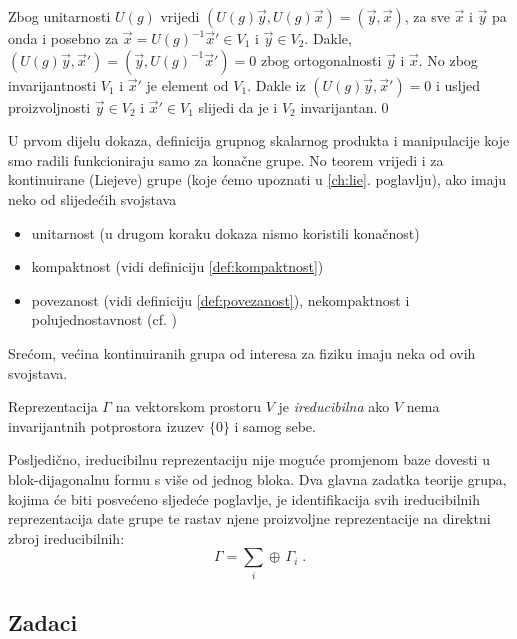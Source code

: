 Zbog unitarnosti $U(g)$ vrijedi $(U(g) \vec{y} , U(g)\vec{x}) = 
(\vec{y}, \vec{x})$,
za sve $\vec{x}$ i $\vec{y}$ pa onda i posebno za 
$\vec{x}=U(g)^{-1}\vec{x}'\in V_1$ i
$\vec{y} \in V_2$. Dakle, $(U(g)\vec{y}, \vec{x}')=(\vec{y}, U(g)^{-1}\vec{x}')
=0$ zbog ortogonalnosti $\vec{y}$ i $\vec{x}$.
No zbog invarijantnosti $V_1$ i $\vec{x}'$ je element od $V_1$. Dakle iz
$(U(g) \vec{y} , \vec{x}') = 0$ i usljed proizvoljnosti $\vec{y}\in V_2$
i $\vec{x}'\in V_1$ slijedi da je i $V_2$ invarijantan.\qed


U prvom dijelu dokaza, definicija grupnog skalarnog produkta i manipulacije
koje smo radili funkcioniraju samo za konačne grupe. No teorem vrijedi i 
za kontinuirane (Liejeve) grupe (koje ćemo upoznati u \ref{ch:lie}. poglavlju),
ako imaju neko od slijedećih svojstava
\begin{itemize}
\item unitarnost (u drugom koraku dokaza nismo koristili konačnost)
\item kompaktnost (vidi definiciju \ref{def:kompaktnost})
\item povezanost (vidi definiciju \ref{def:povezanost}), nekompaktnost i polujednostavnost (cf. \cite[79]{Cornwell:1997})
\end{itemize}
Srećom, većina kontinuiranih grupa od interesa za fiziku imaju neka od ovih svojstava.


\begin{definicija}
Reprezentacija $\Gamma$ na vektorskom prostoru $V$ je
\emph{ireducibilna} ako $V$ nema invarijantnih potprostora
izuzev $\{0\}$ i samog sebe.
\label{def:irrep}
\end{definicija}
Posljedično, ireducibilnu reprezentaciju nije moguće promjenom baze 
dovesti u blok-dijagonalnu formu s više od jednog bloka.
Dva glavna zadatka teorije grupa, kojima će biti posvećeno sljedeće poglavlje,
je identifikacija svih ireducibilnih reprezentacija date grupe te rastav
njene proizvoljne reprezentacije na direktni zbroj ireducibilnih:
\begin{displaymath}
  \Gamma = \sum_{i} \oplus\, \Gamma_{i} \;.
\end{displaymath}



\subsection*{Zadaci}

